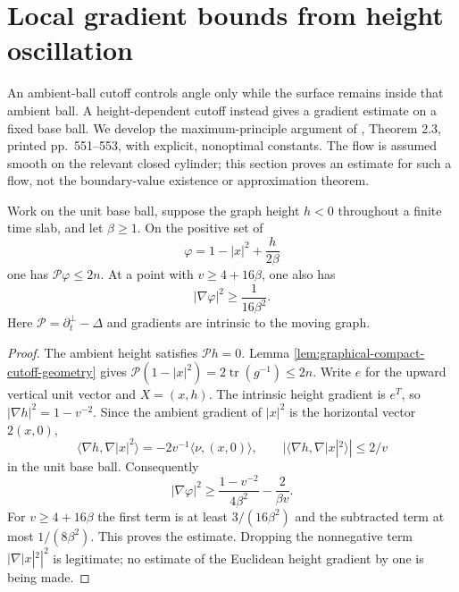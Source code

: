 \chapter{Local gradient bounds from height oscillation}\label{sec:graphical-height-gradient}
An ambient-ball cutoff controls angle only while the surface remains inside that ambient ball. A height-dependent cutoff instead gives a gradient estimate on a fixed base ball. We develop the maximum-principle argument of \cite{EH91}, Theorem 2.3, printed pp.~551--553, with explicit, nonoptimal constants. The flow is assumed smooth on the relevant closed cylinder; this section proves an estimate for such a flow, not the boundary-value existence or approximation theorem.

\begin{lemma}\label{lem:graphical-height-cutoff-gradient}
Work on the unit base ball, suppose the graph height $h<0$ throughout a finite time slab, and let $\beta\geq1$. On the positive set of
\[
 \varphi=1-|x|^2+\frac{h}{2\beta}
\]
one has $\mathcal P\varphi\leq2n$. At a point with $v\geq4+16\beta$, one also has
\[
 |\nabla\varphi|^2\geq\frac1{16\beta^2}.
\]
Here $\mathcal P=\partial_t^\perp-\Delta$ and gradients are intrinsic to the moving graph.
\end{lemma}
\begin{proof}
The ambient height satisfies $\mathcal Ph=0$. Lemma \ref{lem:graphical-compact-cutoff-geometry} gives $\mathcal P(1-|x|^2)=2\operatorname{tr}(g^{-1})\leq2n$. Write $e$ for the upward vertical unit vector and $X=(x,h)$. The intrinsic height gradient is $e^T$, so $|\nabla h|^2=1-v^{-2}$. Since the ambient gradient of $|x|^2$ is the horizontal vector $2(x,0)$,
\[
 \langle\nabla h,\nabla|x|^2\rangle
       =-2v^{-1}\langle\nu,(x,0)\rangle,
 \qquad
 |\langle\nabla h,\nabla|x|^2\rangle|\leq2/v
\]
in the unit base ball. Consequently
\[
 |\nabla\varphi|^2
 \geq\frac{1-v^{-2}}{4\beta^2}-\frac2{\beta v}.
\]
For $v\geq4+16\beta$ the first term is at least $3/(16\beta^2)$ and the subtracted term at most $1/(8\beta^2)$. This proves the estimate. Dropping the nonnegative term $|\nabla|x|^2|^2$ is legitimate; no estimate of the Euclidean height gradient by one is being made.
\end{proof}

